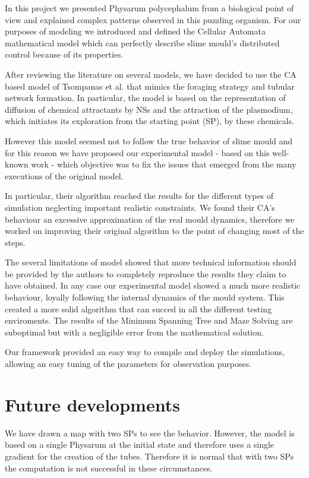 In this project we presented Physarum polycephalum from a biological point of view and explained complex patterns observed in this puzzling organism. For our purposes of modeling we introduced and defined the Cellular Automata mathematical model  which can perfectly describe slime mould's distributed control because of its properties.

\par
After reviewing the literature on several models, we have decided to use the CA based model of Tsompanas et al. \cite{Tsompanas2016} that mimics the foraging strategy and tubular network formation. In particular, the model is based on the representation of diffusion of chemical attractants by NSs and the attraction of the plasmodium, which initiates its exploration from the starting point (SP), by these chemicals. 

\par
However this model seemed not to follow the true behavior of slime mould and for this reason we have proposed our experimental model - based on this well-known work - which objective was to fix the issues that emerged from the many executions of the original model.

\par
In particular, their algorithm reached the results for the different types of simulation neglecting important realistic constraints. We found their CA's behaviour an excessive approximation of the real mould dynamics, therefore we worked on improving their original algorithm to the point of changing most of the steps.

\par
The several limitations of \cite{Tsompanas2016} model showed that more technical information should be provided by the authors to completely reproduce the results they claim to have obtained.
In any case our experimental model showed a much more realistic behaviour, loyally following the internal dynamics of the mould system. This created a more solid algorithm that can succed in all the different testing enviroments. The results of the Minimum Spanning Tree and Maze Solving are suboptimal but with a negligible error from the mathematical solution.

\par
Our framework provided an easy way to compile and deploy the simulations, allowing an easy tuning of the parameters for observation purposes.

\section{Future developments}
We have drawn a map with two SPs to see the behavior. However, the model is based on a single Physarum at the initial state and therefore uses a single gradient for the creation of the tubes. Therefore it is normal that with two SPs the computation is not successful in these circumstances.

